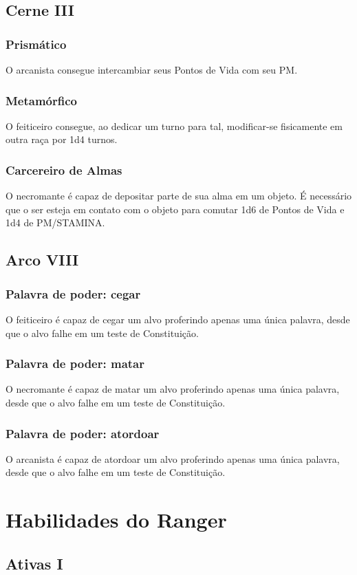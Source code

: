 \documentclass[10pt,twoside,twocolumn]{book}
\begin{document}
\subsection*{Cerne III}
\subsubsection*{Prismático}
O arcanista consegue intercambiar seus Pontos de Vida com seu PM.
\subsubsection*{Metamórfico}
O feiticeiro consegue, ao dedicar um turno para tal, modificar-se fisicamente em outra raça por 1d4 turnos. 
\subsubsection*{Carcereiro de Almas}
O necromante é capaz de depositar parte de sua alma em um objeto. É necessário que o ser esteja em contato com o objeto para comutar 1d6 de Pontos de Vida e 1d4 de PM/STAMINA.


\subsection*{Arco VIII}
\subsubsection*{Palavra de poder: cegar}
O feiticeiro é capaz de cegar um alvo proferindo apenas uma única palavra, desde que o alvo falhe em um teste de Constituição.
\subsubsection*{Palavra de poder: matar}
O necromante é capaz de matar um alvo proferindo apenas uma única palavra, desde que o alvo falhe em um teste de Constituição.
\subsubsection*{Palavra de poder: atordoar}
O arcanista é capaz de atordoar um alvo proferindo apenas uma única palavra, desde que o alvo falhe em um teste de Constituição.

\section{Habilidades do Ranger}

\subsection*{Ativas I}
\end{document}
